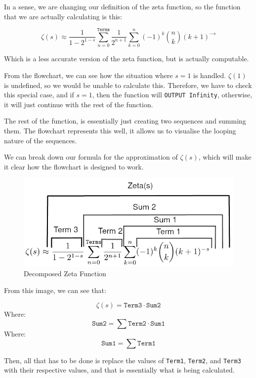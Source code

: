\documentclass[12pt]{article}
\begin{document}
In a sense, we are changing our definition of the zeta function, so the function that we are actually calculating is this:

$$\zeta(s) \approx \frac{1}{1-2^{1-s}} \sum_{n=0}^{\texttt{Terms}} \frac{1}{2^{n+1}} \sum_{k=0}^{n} (-1)^k \binom{n}{k} (k+1)^{-s} $$

Which is a less accurate version of the zeta function, but is actually computable.

From the flowchart, we can see how the situation where $s=1$ is handled. $\zeta(1)$ is undefined, so we would be unable to calculate this. Therefore, we have to check this special case, and if $s=1$, then the function will \texttt{OUTPUT Infinity}, otherwise, it will just continue with the rest of the function.

The rest of the function, is essentially just creating two sequences and summing them. The flowchart represents this well, it allows us to visualise the looping nature of the sequences.

We can break down our formula for the approximation of $\zeta(s)$, which will make it clear how the flowchart is designed to work.

\begin{figure}[h]
    \centering
    \caption{Decomposed Zeta Function}
    \captionsetup{justification=centering}
    \includegraphics[scale=0.4]{zeta-approx-explained}
\end{figure}

From this image, we can see that:

$$\zeta(s) = \texttt{Term3} \cdot \texttt{Sum2}$$
Where:
$$\texttt{Sum2} = \sum \texttt{Term2} \cdot \texttt{Sum1}$$
Where:
$$\texttt{Sum1} = \sum \texttt{Term1}$$

Then, all that has to be done is replace the values of \texttt{Term1}, \texttt{Term2}, and \texttt{Term3} with their respective values, and that is essentially what is being calculated.
\end{document}
